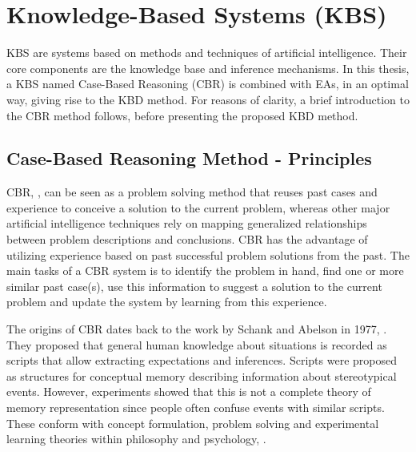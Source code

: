 
\section{Knowledge-Based Systems (KBS)}  
KBS \cite{Akerkar:2009:KS:1795845}  are systems based on methods and techniques of artificial intelligence. Their core components are the knowledge base and inference mechanisms. In this thesis, a KBS named Case-Based Reasoning (CBR) \cite{kolodner_1991} is combined with EAs, in an optimal way, giving rise to the KBD method. For reasons of clarity, a brief introduction to the CBR method follows, before presenting the proposed KBD method.  

\subsection{Case-Based Reasoning Method - Principles}
CBR, \cite{kolodner_1991,kolodner_1993,slade_1991,riesbeck_1989}, can be seen as a problem solving method that reuses past cases and experience to conceive a solution to the current problem, 
whereas other major artificial intelligence techniques rely on mapping generalized 
relationships between problem descriptions and conclusions. CBR has the advantage 
of utilizing  experience based on past successful problem solutions from the past. 
The main tasks of a CBR system is to identify the problem in hand, find one or 
more similar past case(s), use this information to suggest a solution to the current 
problem and update the system by learning from this experience.      

\label{History} The origins of CBR dates back to the work by
Schank and Abelson in 1977, \cite{Schank_Abelson_1977}. They proposed that general 
human knowledge about situations is recorded as scripts that allow extracting 
 expectations and inferences. Scripts were proposed as structures for conceptual 
memory describing information about stereotypical events. However, experiments 
showed that this is not a complete theory of memory representation since people 
often confuse events with similar scripts. These conform with 
concept formulation, problem solving and experimental learning theories within 
philosophy and psychology, \cite{tulving_1977,smith_1978}. 

